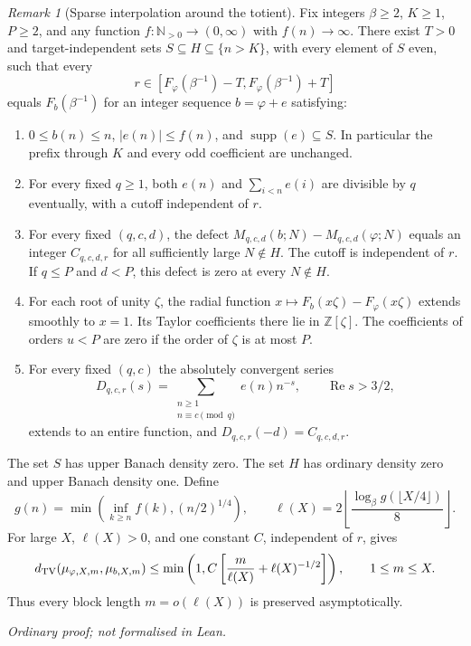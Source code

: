 \documentclass[11pt]{article}
\theoremstyle{plain}
\theoremstyle{definition}
\theoremstyle{remark}
\newtheorem{rem}[thm]{Remark}
\newcommand{\N}{\mathbb{N}}
\newcommand{\Z}{\mathbb{Z}}
\begin{document}
\begin{rem}[Sparse interpolation around the totient]
\label{long249:thm:signed-interpolation}
Fix integers $\beta\ge2$, $K\ge1$, $P\ge2$, and any function
$f:\N_{>0}\to(0,\infty)$ with $f(n)\to\infty$. There exist $T>0$ and
target-independent sets $S\subseteq H\subseteq\{n>K\}$, with every
element of $S$ even, such that every
\[
 r\in[F_\varphi(\beta^{-1})-T,F_\varphi(\beta^{-1})+T]
\]
equals $F_b(\beta^{-1})$ for an integer sequence $b=\varphi+e$ satisfying:
\begin{enumerate}[label=(\roman*)]
\item $0\le b(n)\le n$, $|e(n)|\le f(n)$, and
$\operatorname{supp}(e)\subseteq S$. In particular the prefix through $K$
and every odd coefficient are unchanged.
\item For every fixed $q\ge1$, both $e(n)$ and $\sum_{i<n}e(i)$ are
divisible by $q$ eventually, with a cutoff independent of $r$.
\item For every fixed $(q,c,d)$, the defect
$M_{q,c,d}(b;N)-M_{q,c,d}(\varphi;N)$ equals an integer $C_{q,c,d,r}$
for all sufficiently large $N\notin H$. The cutoff is independent of $r$.
If $q\le P$ and $d<P$, this defect is zero at every $N\notin H$.
\item For each root of unity $\zeta$, the radial function
$x\mapsto F_b(x\zeta)-F_\varphi(x\zeta)$ extends smoothly to $x=1$.
Its Taylor coefficients there lie in $\Z[\zeta]$. The coefficients of
orders $u<P$ are zero if the order of $\zeta$ is at most $P$.
\item For every fixed $(q,c)$ the absolutely convergent series
\[
 D_{q,c,r}(s)=\sum_{\substack{n\ge1\\n\equiv c\pmod q}}e(n)n^{-s},
 \qquad \operatorname{Re}s>3/2,
\]
extends to an entire function, and $D_{q,c,r}(-d)=C_{q,c,d,r}$.
\end{enumerate}
The set $S$ has upper Banach density zero. The set $H$ has ordinary density
zero and upper Banach density one. Define
\[
 g(n)=\min\left(\inf_{k\ge n}f(k),(n/2)^{1/4}\right),\qquad
 \ell(X)=2\left\lfloor\frac{\log_\beta g(\lfloor X/4\rfloor)}8\right\rfloor.
\]
For large $X$, $\ell(X)>0$, and one constant $C$, independent of $r$, gives
\[
 d_{\rm TV}(\mu_{\varphi,X,m},\mu_{b,X,m})
 \le\min\left(1,C\left[\frac m{\ell(X)}+\ell(X)^{-1/2}\right]\right),
 \qquad 1\le m\le X.
\]
Thus every block length $m=o(\ell(X))$ is preserved asymptotically.
\end{rem}
\noindent\emph{Ordinary proof; not formalised in Lean.}
\end{document}
